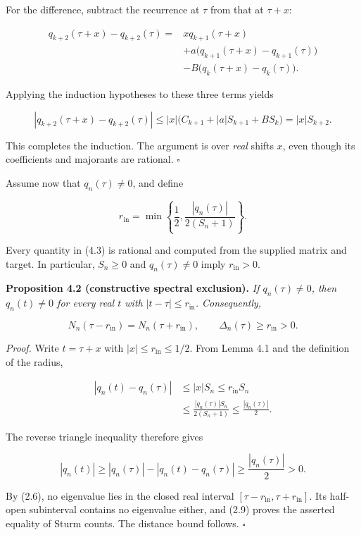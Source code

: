 \documentclass[
  11pt,
]{article}
\begin{document}
For the difference, subtract the recurrence at \(\tau\) from that at
\(\tau+x\):

\[
\begin{aligned}
q_{k+2}(\tau+x)-q_{k+2}(\tau)
={}&xq_{k+1}(\tau+x)\\
&+a\bigl(q_{k+1}(\tau+x)-q_{k+1}(\tau)\bigr)\\
&-B\bigl(q_k(\tau+x)-q_k(\tau)\bigr).
\end{aligned}
\]

Applying the induction hypotheses to these three terms yields

\[
|q_{k+2}(\tau+x)-q_{k+2}(\tau)|
\le |x|\bigl(C_{k+1}+|a|S_{k+1}+BS_k\bigr)
=|x|S_{k+2}.
\]

This completes the induction. The argument is over \emph{real} shifts
\(x\), even though its coefficients and majorants are rational.
\(\square\)

Assume now that \(q_n(\tau)\ne0\), and define

\[
\boxed{
 r_{\mathrm{in}}=
 \min\left\{\frac12,
 \frac{|q_n(\tau)|}{2(S_n+1)}\right\}.}
\tag{4.3}
\]

Every quantity in (4.3) is rational and computed from the supplied
matrix and target. In particular, \(S_n\ge0\) and \(q_n(\tau)\ne0\)
imply \(r_{\mathrm{in}}>0\).

\textbf{Proposition 4.2 (constructive spectral exclusion).} \emph{If
\(q_n(\tau)\ne0\), then \(q_n(t)\ne0\) for every real \(t\) with
\(|t-\tau|\le r_{\mathrm{in}}\). Consequently,}

\[
N_n(\tau-r_{\mathrm{in}})
=N_n(\tau+r_{\mathrm{in}}),
\qquad
\Delta_n(\tau)\ge r_{\mathrm{in}}>0.
\tag{4.4}
\]

\emph{Proof.} Write \(t=\tau+x\) with \(|x|\le r_{\mathrm{in}}\le1/2\).
From Lemma 4.1 and the definition of the radius,

\[
\begin{aligned}
|q_n(t)-q_n(\tau)|
&\le |x|S_n
\le r_{\mathrm{in}}S_n\\
&\le \frac{|q_n(\tau)|S_n}{2(S_n+1)}
\le\frac{|q_n(\tau)|}{2}.
\end{aligned}
\]

The reverse triangle inequality therefore gives

\[
|q_n(t)|\ge |q_n(\tau)|-|q_n(t)-q_n(\tau)|
\ge\frac{|q_n(\tau)|}{2}>0.
\tag{4.5}
\]

By (2.6), no eigenvalue lies in the closed real interval
\([\tau-r_{\mathrm{in}},\tau+r_{\mathrm{in}}]\). Its half-open
subinterval contains no eigenvalue either, and (2.9) proves the asserted
equality of Sturm counts. The distance bound follows. \(\square\)
\end{document}
